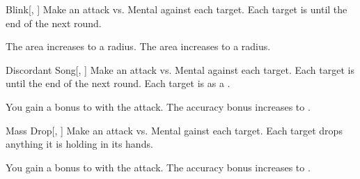 \lowercase{\hypertarget{spell:Blink}{}}\label{spell:Blink}
\begin{freeability}[Rank 4]{\hypertarget{spell:Blink}{Blink}}[, ]
Make an attack vs. Mental against each target.
\hit Each target is  until the end of the next round.

\rankline
{} The area increases to a \areamed radius.
 The area increases to a \arealarge radius.
\end{freeability}
\vspace{0.25em}



\lowercase{\hypertarget{spell:Discordant Song}{}}\label{spell:Discordant Song}
\begin{freeability}[Rank 4]{\hypertarget{spell:Discordant Song}{Discordant Song}}[, ]
Make an attack vs. Mental against each target.
\hit Each target is \disoriented until the end of the next round.
\crit Each target is  as a .

\rankline
{} You gain a  bonus to  with the attack.
 The accuracy bonus increases to .
\end{freeability}
\vspace{0.25em}



\lowercase{\hypertarget{spell:Mass Drop}{}}\label{spell:Mass Drop}
\begin{freeability}[Rank 4]{\hypertarget{spell:Mass Drop}{Mass Drop}}[, ]
Make an attack vs. Mental gainst each target.
\hit Each target drops anything it is holding in its hands.

\rankline
{} You gain a  bonus to  with the attack.
 The accuracy bonus increases to .
\end{freeability}
\vspace{0.25em}



